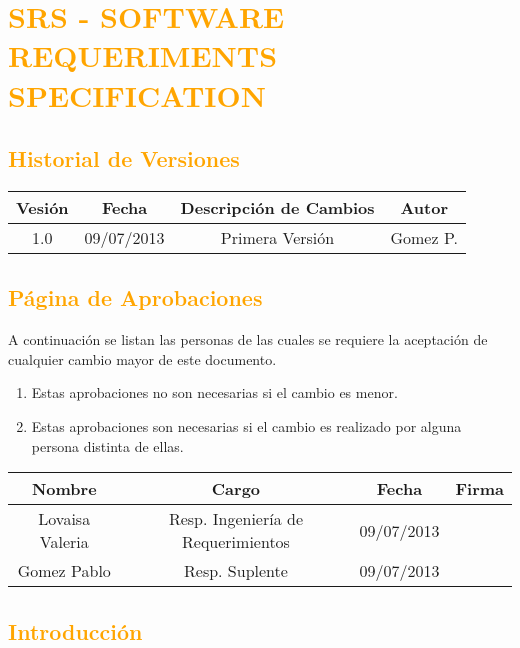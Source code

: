 \chapter{\textcolor{orange}{SRS - SOFTWARE REQUERIMENTS SPECIFICATION}}
\newpage
\section{\textcolor{orange}{Historial de Versiones}}
\begin{table}[H]
\begin{center}
\begin{tabular}{|c|c|c|c|}
\hline
\rowcolor[RGB]{255,127,0} Vesión & Fecha & Descripción de Cambios & Autor\\
\hline
1.0 & 09/07/2013 & Primera Versión & Gomez P.\\
\hline
\end{tabular}
\end{center}
\end{table}
\newpage

\section{\textcolor{orange}{Página de Aprobaciones}}
A continuación se listan las personas de las cuales se requiere la aceptación de
cualquier cambio mayor de este documento.
\begin{enumerate}
  \item Estas aprobaciones no son necesarias si el cambio es menor.
  \item Estas aprobaciones son necesarias si el cambio es realizado por alguna
  persona distinta de ellas.
\end{enumerate}
\begin{table}[!h]
\begin{center}
\begin{tabular}{|c|c|c|c|}
\hline
\rowcolor[RGB]{255,127,0} Nombre & Cargo & Fecha & Firma\\
\hline
Lovaisa Valeria & Resp. Ingeniería de Requerimientos & 09/07/2013 & \\
\hline
Gomez Pablo & Resp. Suplente & 09/07/2013 & \\
\hline
\end{tabular}
\end{center}
\end{table}

\newpage
\section{\textcolor{orange}{Introducción}}
